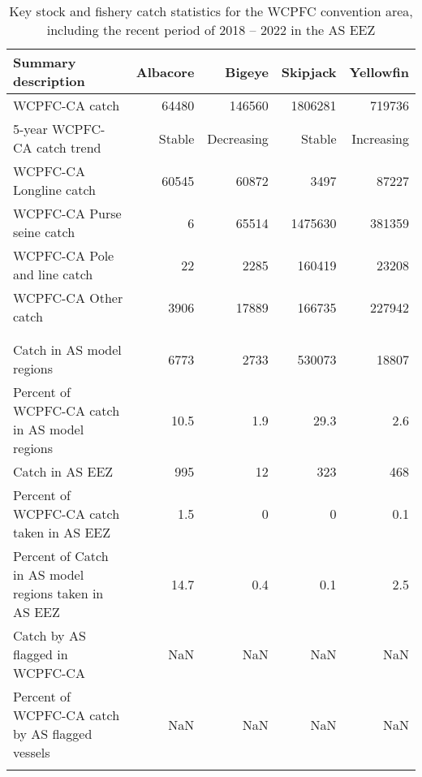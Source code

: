 \begin{longtable}{lrrrr}
\caption{Key stock and fishery catch statistics for the WCPFC convention area, including the recent period of 2018 -- 2022 in the AS EEZ} \\ 
  \hline
Summary description & Albacore & Bigeye & Skipjack & Yellowfin \\ 
  \hline
WCPFC-CA catch & 64480 & 146560 & 1806281 & 719736 \\ 
  5-year WCPFC-CA catch trend & Stable & Decreasing & Stable & Increasing \\ 
  WCPFC-CA Longline catch & 60545 & 60872 & 3497 & 87227 \\ 
  WCPFC-CA Purse seine catch & 6 & 65514 & 1475630 & 381359 \\ 
  WCPFC-CA Pole and line catch & 22 & 2285 & 160419 & 23208 \\ 
  WCPFC-CA Other catch & 3906 & 17889 & 166735 & 227942 \\ 
   &  &  &  &  \\ 
   &  &  &  &  \\ 
   \hline
Catch in AS model regions & 6773 & 2733 & 530073 & 18807 \\ 
  Percent of WCPFC-CA catch in AS model regions & 10.5 & 1.9 & 29.3 & 2.6 \\ 
  Catch in AS EEZ & 995 & 12 & 323 & 468 \\ 
  Percent of WCPFC-CA catch taken in AS EEZ & 1.5 & 0 & 0 & 0.1 \\ 
  Percent of Catch in AS model regions taken in AS EEZ & 14.7 & 0.4 & 0.1 & 2.5 \\ 
  Catch by AS flagged in WCPFC-CA & NaN & NaN & NaN & NaN \\ 
  Percent of WCPFC-CA catch by AS flagged vessels & NaN & NaN & NaN & NaN \\ 
  \hline
\label{cat_sum_tab}
\end{longtable}
